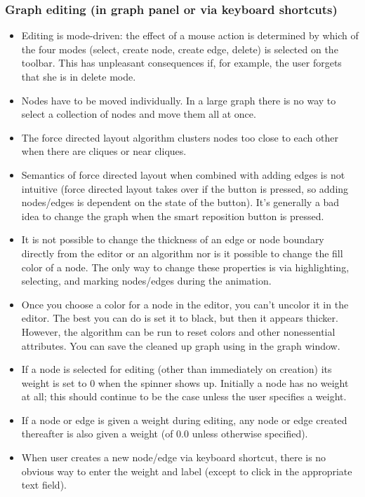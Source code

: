\subsubsection*{Graph editing (in graph panel or via keyboard shortcuts)}

\begin{itemize}

\item Editing is mode-driven: the effect of a mouse action is determined by
  which of the four modes (select, create node, create edge, delete) is
  selected on the toolbar. This has unpleasant consequences if, for example,
  the user forgets that she is in delete mode.

\item Nodes have to be moved individually. In a large graph there is no way
  to select a collection of nodes and move them all at once.

\item The force directed layout algorithm clusters nodes too close to each
  other when there are cliques or near cliques.

\item Semantics of force directed layout when combined with adding edges is
  not intuitive (force directed layout takes over if the button is pressed,
  so adding nodes/edges is dependent on the state of the button). It's
  generally a bad idea to change the graph when the smart reposition button
  is pressed.

\item It is not possible to change the thickness of an edge or node boundary
  directly from the editor or an algorithm nor is it possible to change the
  fill color of a node.  The only way to change these properties is via
  highlighting, selecting, and marking nodes/edges during the animation.

\item Once you choose a color for a node in the editor, you can't uncolor it in
  the editor. The best you can do is set it to black, but then it appears
  thicker. However, the algorithm  can be run to
  reset colors and other nonessential attributes. You can save the cleaned up
  graph using  in the graph window.

\item If a node is selected for editing (other than immediately on creation)
  its weight is set to 0 when the spinner shows up.  Initially a node has no
  weight at all; this should continue to be the case unless the user
  specifies a weight.

\item If a node or edge is given a weight during editing, any node or edge
  created thereafter is also given a weight (of 0.0 unless otherwise
  specified).
  
\item When user creates a new node/edge via keyboard shortcut, there is no
  obvious way to enter the weight and label (except to click in the
  appropriate text field).

\end{itemize}

